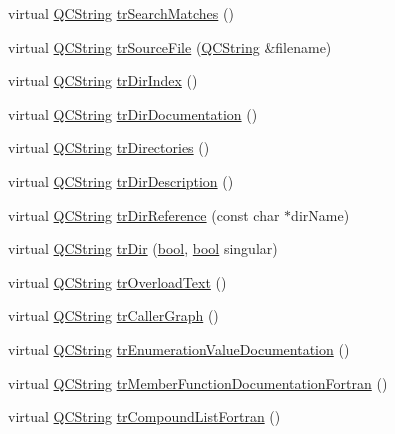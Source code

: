 \begin{DoxyCompactItemize}
virtual \hyperlink{class_q_c_string}{Q\+C\+String} \hyperlink{class_translator_ukrainian_ab8f943013cbf8a2e81bdf51d81e48f3b}{tr\+Search\+Matches} ()
\item 
virtual \hyperlink{class_q_c_string}{Q\+C\+String} \hyperlink{class_translator_ukrainian_aec640e3c7bc9db35db62c2b2e3a00c5b}{tr\+Source\+File} (\hyperlink{class_q_c_string}{Q\+C\+String} \&filename)
\item 
virtual \hyperlink{class_q_c_string}{Q\+C\+String} \hyperlink{class_translator_ukrainian_aef569512f61552361990065648b15d10}{tr\+Dir\+Index} ()
\item 
virtual \hyperlink{class_q_c_string}{Q\+C\+String} \hyperlink{class_translator_ukrainian_a7b89c731c6b93688846799891b2d9529}{tr\+Dir\+Documentation} ()
\item 
virtual \hyperlink{class_q_c_string}{Q\+C\+String} \hyperlink{class_translator_ukrainian_ac75e514ec56fb37ee24ac8064128860a}{tr\+Directories} ()
\item 
virtual \hyperlink{class_q_c_string}{Q\+C\+String} \hyperlink{class_translator_ukrainian_a6acbb67a336a734ecac4257e0f0b8ccd}{tr\+Dir\+Description} ()
\item 
virtual \hyperlink{class_q_c_string}{Q\+C\+String} \hyperlink{class_translator_ukrainian_ab72a2205f1684a9a9b5907c52a3e7eff}{tr\+Dir\+Reference} (const char $\ast$dir\+Name)
\item 
virtual \hyperlink{class_q_c_string}{Q\+C\+String} \hyperlink{class_translator_ukrainian_a01f332ff6918c2cc3c51d08fa098049e}{tr\+Dir} (\hyperlink{qglobal_8h_a1062901a7428fdd9c7f180f5e01ea056}{bool}, \hyperlink{qglobal_8h_a1062901a7428fdd9c7f180f5e01ea056}{bool} singular)
\item 
virtual \hyperlink{class_q_c_string}{Q\+C\+String} \hyperlink{class_translator_ukrainian_a1328697f3b6775bb87f0230e5930fd4b}{tr\+Overload\+Text} ()
\item 
virtual \hyperlink{class_q_c_string}{Q\+C\+String} \hyperlink{class_translator_ukrainian_a0a3e38a59461b3681f256178125fc943}{tr\+Caller\+Graph} ()
\item 
virtual \hyperlink{class_q_c_string}{Q\+C\+String} \hyperlink{class_translator_ukrainian_a44f81c1379feda3765e0f3aab42f7b44}{tr\+Enumeration\+Value\+Documentation} ()
\item 
virtual \hyperlink{class_q_c_string}{Q\+C\+String} \hyperlink{class_translator_ukrainian_a8c363a0f8dc2714c0c13a2c03bf96368}{tr\+Member\+Function\+Documentation\+Fortran} ()
\item 
virtual \hyperlink{class_q_c_string}{Q\+C\+String} \hyperlink{class_translator_ukrainian_aa29b2d5efb318705bdca734eb5228674}{tr\+Compound\+List\+Fortran} ()

\end{DoxyCompactItemize}
